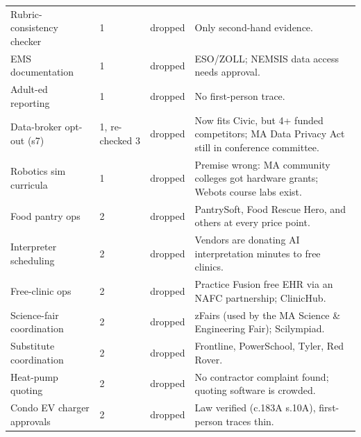 \documentclass[11pt]{article}
\begin{document}
\begin{longtable}{@{}L{3.3cm} L{1.4cm} L{1.5cm} L{8.5cm}@{}}
Rubric-consistency checker & 1 & dropped & Only second-hand evidence.\\
EMS documentation & 1 & dropped & ESO/ZOLL; NEMSIS data access needs approval.\\
Adult-ed reporting & 1 & dropped & No first-person trace.\\
Data-broker opt-out (s7) & 1, re-checked 3 & dropped & Now fits Civic, but 4+ funded competitors; MA Data Privacy Act still in conference committee.\\
Robotics sim curricula & 1 & dropped & Premise wrong: MA community colleges got hardware grants; Webots course labs exist.\\
Food pantry ops & 2 & dropped & PantrySoft, Food Rescue Hero, and others at every price point.\\
Interpreter scheduling & 2 & dropped & Vendors are donating AI interpretation minutes to free clinics.\\
Free-clinic ops & 2 & dropped & Practice Fusion free EHR via an NAFC partnership; ClinicHub.\\
Science-fair coordination & 2 & dropped & zFairs (used by the MA Science \& Engineering Fair); Scilympiad.\\
Substitute coordination & 2 & dropped & Frontline, PowerSchool, Tyler, Red Rover.\\
Heat-pump quoting & 2 & dropped & No contractor complaint found; quoting software is crowded.\\
Condo EV charger approvals & 2 & dropped & Law verified (c.183A s.10A), first-person traces thin.\\
\bottomrule
\end{longtable}

\end{document}
